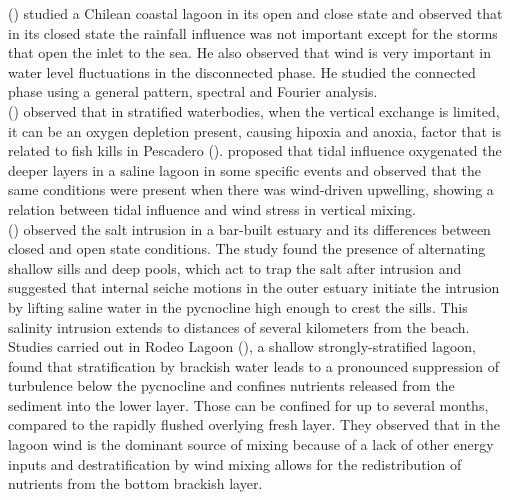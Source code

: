\documentclass[11pt,letterpaper]{article}
\begin{document}
\citeauthor{dussaillant2009} (\cite*{dussaillant2009}) studied a Chilean coastal lagoon in its open and close state and observed that in its closed state the rainfall influence was not important except for the storms that open the inlet to the sea. He also observed that wind is very important in water level fluctuations in the disconnected phase. He studied the connected phase using a general pattern, spectral and Fourier analysis.\\

\citeauthor{Kelly2018} (\cite*{Kelly2018}) observed that in stratified waterbodies, when the vertical exchange is limited, it can be an oxygen depletion present, causing hipoxia and anoxia, factor that is related to fish kills in Pescadero (\cite{largier2015}). \citeauthor{Kelly2018} proposed that tidal influence oxygenated the deeper layers in a saline lagoon in some specific events and observed that the same conditions were present when there was wind-driven upwelling, showing a relation between tidal influence and wind stress in vertical mixing.\\

\citeauthor{Behrens2016} (\cite*{Behrens2016}) observed the salt intrusion in a bar-built estuary and its differences between closed and open state conditions. The study found the presence of alternating shallow sills and deep pools, which act to trap the salt after intrusion and suggested that internal seiche motions in the outer estuary initiate the intrusion by lifting saline water in the pycnocline high enough to crest the sills. This salinity intrusion extends to distances of several kilometers from the beach.\\

Studies carried out in Rodeo Lagoon (\cite{Cousins2010}), a shallow strongly-stratified lagoon, found that stratification by brackish water leads to a pronounced suppression of turbulence below the pycnocline and confines nutrients released from the sediment into the lower layer. Those can be confined for up to several months, compared to the rapidly flushed overlying fresh layer. They observed that in the lagoon wind is the dominant source of mixing because of a lack of other energy inputs and destratification by wind mixing allows for the redistribution of nutrients from the bottom brackish layer.\\

\end{document}
